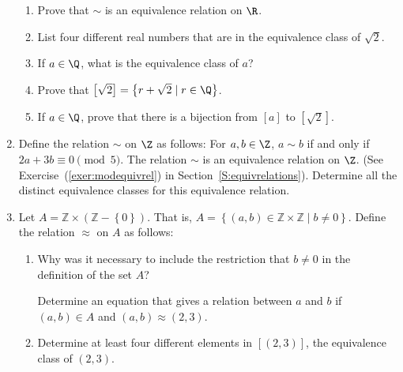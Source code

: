 \begin{enumerate}
\begin{enumerate}
\item Prove that $\sim$ is an equivalence relation on $\R$.
\item List four different real numbers that are in the equivalence class of $\sqrt{2}$.
\item If $a \in \Q$, what is the equivalence class of $a$?
\item Prove that $\left[ \sqrt{2} \right] = \left\{ r + \sqrt{2} \mid r \in \Q \right\}$.
\item If $a \in \Q$, prove that there is a bijection from $\left[ a \right]$ to 
$\left[ \sqrt{2} \right]$.
\end{enumerate}


\item Define the relation $\sim$ on $\Z$ as follows:  For $a, b \in \Z$, $a \sim b$ if and only if $2a + 3b \equiv 0 \pmod 5$.  The relation $\sim$ is an equivalence relation on 
$\Z$.  (See Exercise~(\ref{exer:modequivrel}) in Section~\ref{S:equivrelations}).  Determine all the distinct equivalence classes for this equivalence relation.


\item Let  $A = \mathbb{Z} \times \left( {\mathbb{Z} - \left\{ 0 \right\}} \right)$.  That is,  $A = \left\{ { {\left( {a, b} \right) \in \mathbb{Z} \times \mathbb{Z} } \mid b \ne 0} \right\}$.  Define the relation  $ \approx $ on  $A$  as follows: \label{exer:sec73-rationals}


\begin{enumerate}
  \yitem Prove that  $ \approx $  is an equivalence relation on  $A$.

  \item Why was it necessary to include the restriction that  $b \ne 0$ in the definition of          the set  $A$?

  \yitem Determine an equation that gives a relation between  $a$  and  $b$  if  
        $\left( {a, b} \right) \in A$  and  
        $\left( {a, b} \right) \approx \left( {2, 3} \right)$.

  \item Determine at least four different elements in  
        $\left[ {\left( {2, 3} \right)} \right]$, the equivalence class of  
        $\left( {2, 3} \right)$.


\end{enumerate}
\end{enumerate}
